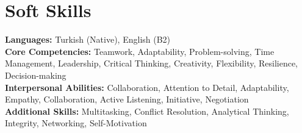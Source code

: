 \documentclass[letterpaper,11pt]{article}
\newcommand{\resumeSubHeadingListStart}{\begin{itemize}[leftmargin=0.15in, label={}]}
\newcommand{\resumeSubHeadingListEnd}{\end{itemize}}
\begin{document}
  
  
  \section{Soft Skills}
    \vspace{2pt}
    \resumeSubHeadingListStart
      \small{\item{
          \textbf{Languages:}{ Turkish (Native), English (B2)}  \\ \vspace{3pt}
          \textbf{Core Competencies:}{ Teamwork, Adaptability, Problem-solving, Time Management, Leadership, Critical Thinking, Creativity, Flexibility, Resilience, Decision-making}  \\ \vspace{3pt}
          \textbf{Interpersonal Abilities:}{ Collaboration, Attention to Detail, Adaptability, Empathy, Collaboration, Active Listening, Initiative, Negotiation}  \\ \vspace{3pt}
          \textbf{Additional Skills:}{ Multitasking, Conflict Resolution, Analytical Thinking, Integrity, Networking, Self-Motivation}
      }}
    \resumeSubHeadingListEnd
  
\end{document}
